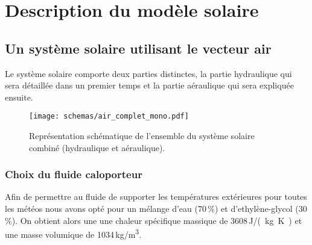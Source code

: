 

\section{Description du modèle solaire} %
\label{sec:description_du_modele_solaire}

\subsection{Un système solaire utilisant le vecteur air} %
\label{sub:un_systeme_solaire_utilisant_le_vecteur_air}
Le système solaire  comporte deux parties distinctes,
la partie hydraulique qui sera détaillée dans un premier temps et la partie
aéraulique qui sera expliquée ensuite.
\begin{figure}
    \begin{center}
        \texttt{[image: schemas/air\_complet\_mono.pdf]}
    \end{center}
    \caption{Représentation schématique de l’ensemble du système solaire combiné
             (hydraulique et aéraulique).
             \label{fig:air_complet_mono}}
\end{figure}

\subsubsection{Choix du fluide caloporteur} %
\label{ssub:choix_du_fluide_caloporteur}
Afin de permettre au fluide de supporter les températures extérieures pour toutes
les météos nous avons opté pour un mélange d’eau (70\,\%) et d’ethylène-glycol (30\,\%).
On obtient alors une une chaleur spécifique massique de 3608\,\si{J/(kg.K)} et une
masse volumique de 1034\,\si{kg/m^3}.

